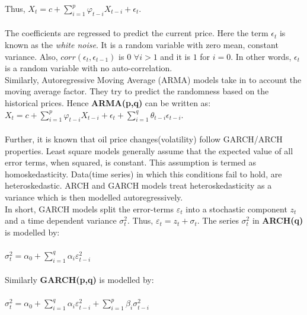 \documentclass[runningheads]{llncs}
\begin{document}
\noindent Thus, $ X_{t} = c + \sum\limits_{i=1}^p \varphi_{t-i}X_{t-i} + \epsilon_{t}$.\\\\

\noindent The coefficients are regressed to predict the current price. Here the term $\epsilon_{t}$ is known as the \textit{white noise}. It is a random variable with zero mean, constant variance. Also, $corr(\epsilon_t,\epsilon_{t-1})$ is $0$ $\forall i>1$ and it is $1$ for $i=0$. In other words, $\epsilon_{t}$ is a random variable with no auto-correlation.\\

\noindent Similarly, Autoregressive Moving Average (ARMA) models take in to account the moving average factor. They try to predict the randomness based on the historical prices.  Hence \textbf{ARMA(p,q)} can be written as:\\

$ X_{t} = c + \sum\limits_{i=1}^p \varphi_{t-i}X_{t-i} + \epsilon_{t} + \sum\limits_{i=1}^q \theta_{t-i}\epsilon_{t-i}$.\\
\\

\noindent Further, it is known that oil price changes(volatility) follow GARCH/ARCH properties. Least square models generally assume that the expected value of all error terms, when squared, is constant. This assumption is termed as homoskedasticity. Data(time series) in which this conditions fail to hold, are heteroskedastic. ARCH and GARCH models treat heteroskedasticity as a variance which is then modelled autoregressively.\cite{engle}\\

\noindent In short, GARCH models split the error-terms $\varepsilon_t$ into a stochastic component $z_{t}$ and a time dependent variance $\sigma^2_{t}$. Thus, $ \varepsilon_t = z_{t} + \sigma_{t}$. The series $\sigma^2_{t}$ in \textbf{ARCH(q)} is modelled by:\\\\

$\sigma^2_{t} = \alpha_{0} + \sum\limits_{i=1}^q \alpha_{i}\varepsilon_{t-i}^2 $\\\\

\noindent Similarly \textbf{GARCH(p,q)} is modelled by:\\\\

$\sigma^2_{t} = \alpha_{0} + \sum\limits_{i=1}^q \alpha_{i}\varepsilon_{t-i}^2 + \sum\limits_{i=1}^p \beta_{i}\sigma_{t-i}^2 $\\\\
\end{document}
